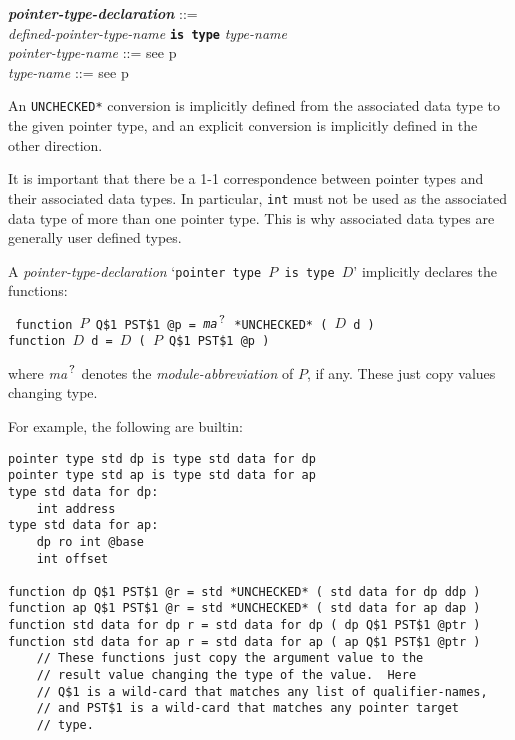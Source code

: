 \documentclass[12pt]{article}
\newcommand{\TT}[1]{{\tt \bfseries #1}}
\newcommand{\QMARK}{{$^{\,\mbox{\footnotesize ?}}$}}
\newcommand{\ttkey}[1]{{\tt \bfseries #1}}
\newcommand{\emkey}[1]{{\em \bfseries #1}}
\newcommand{\pagref}[1]{p\pageref{#1}}
\newenvironment{indpar}[1][0.3in]%
	{\begin{list}{}%
		     {\setlength{\itemsep}{0in}%
		      \setlength{\topsep}{0in}%
		      \setlength{\parsep}{1ex}%
		      \setlength{\labelwidth}{#1}%
		      \setlength{\leftmargin}{#1}%
		      \addtolength{\leftmargin}{\labelsep}}%
	 \item}%
	{\end{list}}
\begin{document}
\begin{indpar}
\emkey{pointer-type-declaration}\label{POINTER-TYPE-DECLARATION} ::= \\
\hspace*{0.5in}\ttkey{pointer type} {\em defined-pointer-type-name}
	       \TT{is type} {\em type-name}
\\[0.5ex]
{\em pointer-type-name} ::= see \pagref{POINTER-TYPE-NAME}
\\[0.5ex]
{\em type-name} ::= see \pagref{TYPE-NAME}
\end{indpar}
An {\tt *UNCHECKED*} conversion is implicitly defined from the associated data
type to the given pointer type, and an explicit conversion
is implicitly defined in the other direction.

It is important that there be a 1-1 correspondence between
pointer types and their associated data types.  In particular,
{\tt int} must not be used as the associated data type of
more than one pointer type.  This is why associated data types
are generally user defined types.

A {\em pointer-type-declaration} `{\tt pointer type $P$ is type $D$}'
implicitly declares the functions:
\begin{indpar} \tt
function $P$ Q\$1 PST\$1 @p = {\em ma}\QMARK{} *UNCHECKED* ( $D$ d ) \\
function $D$ d = $D$ ( $P$ Q\$1 PST\$1 @p )
\end{indpar}
where {\em ma}\QMARK{} denotes the {\em module-abbreviation} of $P$,
if any.
These just copy values changing type.

For example, the following are builtin:

\begin{indpar}\begin{verbatim}
pointer type std dp is type std data for dp
pointer type std ap is type std data for ap
type std data for dp:
    int address
type std data for ap:
    dp ro int @base
    int offset

function dp Q$1 PST$1 @r = std *UNCHECKED* ( std data for dp ddp )
function ap Q$1 PST$1 @r = std *UNCHECKED* ( std data for ap dap )
function std data for dp r = std data for dp ( dp Q$1 PST$1 @ptr )
function std data for ap r = std data for ap ( ap Q$1 PST$1 @ptr )
    // These functions just copy the argument value to the
    // result value changing the type of the value.  Here
    // Q$1 is a wild-card that matches any list of qualifier-names,
    // and PST$1 is a wild-card that matches any pointer target
    // type.
\end{verbatim}\end{indpar}
\end{document}

